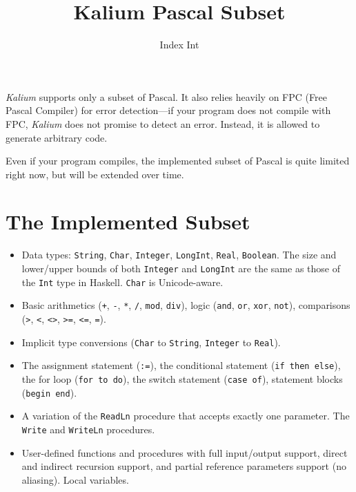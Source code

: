 \documentclass [a4paper] {article}
\title { Kalium Pascal Subset }
\author { Index Int }
\begin{document}
\maketitle

\lstset{language=Pascal}

\emph{Kalium} supports only a subset of Pascal. It also relies heavily on FPC
(Free Pascal Compiler) for error detection---if your program does not compile
with FPC, \emph{Kalium} does not promise to detect an error. Instead, it is
allowed to generate arbitrary code.

Even if your program compiles, the implemented subset of Pascal is quite limited
right now, but will be extended over time.

\section { The Implemented Subset }

\begin {itemize}

\item Data types: \texttt{String}, \texttt{Char}, \texttt{Integer},
\texttt{LongInt}, \texttt{Real}, \texttt{Boolean}. The size and lower/upper
bounds of both \texttt{Integer} and \texttt{LongInt} are the same as those of
the \texttt{Int} type in Haskell. \texttt{Char} is Unicode-aware.

\item Basic arithmetics (\texttt{+}, \texttt{-}, \texttt{*}, \texttt{/},
\texttt{mod}, \texttt{div}), logic (\texttt{and}, \texttt{or}, \texttt{xor},
\texttt{not}), comparisons (\texttt{>}, \texttt{<}, \texttt{<>}, \texttt{>=},
\texttt{<=}, \texttt{=}).

\item Implicit type conversions (\texttt{Char} to \texttt{String},
\texttt{Integer} to \texttt{Real}).

\item The assignment statement (\texttt{:=}), the conditional statement
(\texttt{if then else}), the for loop (\texttt{for to do}), the switch statement
(\texttt{case of}), statement blocks (\texttt{begin end}).

\item A variation of the \texttt{ReadLn} procedure that accepts exactly one
parameter. The \texttt{Write} and \texttt{WriteLn} procedures.

\item User-defined functions and procedures with full input/output support,
direct and indirect recursion support, and partial reference parameters support
(no aliasing). Local variables.

\end {itemize}
\end{document}
